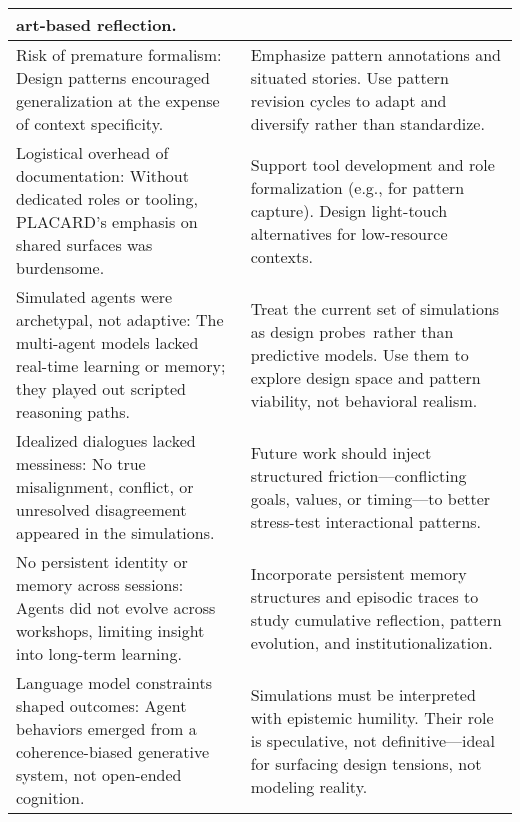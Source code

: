 \documentclass[acmlarge,timestamp]{acmart}
\begin{document}
\begin{longtable}[]{@{}p{}p{}@{}}
{art-based reflection.} \\ \hline
{Risk of premature formalism}{: Design patterns encouraged
generalization at the expense of context specificity.} 
& {Emphasize
pattern annotations and situated stories. Use pattern revision cycles to
adapt and diversify rather than standardize.} \\ \hline
{Logistical overhead of documentation}{: Without dedicated roles or
tooling, PLACARD's emphasis on shared surfaces was burdensome.} 
&
{Support tool development and role formalization (e.g., for
pattern capture). Design light-touch alternatives for low-resource
contexts.} \\ \hline
{Simulated agents were archetypal, not adaptive}{: The multi-agent
models lacked real-time learning or memory; they played out scripted
reasoning paths.} 
& {Treat the current set of simulations as }{design
probes}{~rather than predictive models. Use them to explore design space
and pattern viability, not behavioral realism.} \\ \hline
{Idealized dialogues lacked messiness}{: No true misalignment, conflict,
or unresolved disagreement appeared in the simulations.} 
& {Future work
should inject structured friction---conflicting goals, values, or
timing---to better stress-test interactional patterns.} \\ \hline
{No persistent identity or memory across sessions}{: Agents did not
evolve across workshops, limiting insight into long-term learning.} 
& {Incorporate persistent memory structures and episodic traces to
    study cumulative reflection, pattern evolution, and
    institutionalization.} \\ \hline
 {Language model constraints
  shaped outcomes}{: Agent behaviors emerged from a coherence-biased
  generative system, not open-ended cognition.}
& {Simulations must be interpreted with epistemic humility. Their role
    is speculative, not definitive---ideal for surfacing design
    tensions, not modeling reality.} \\ \hline

\end{longtable}

\end{document}

